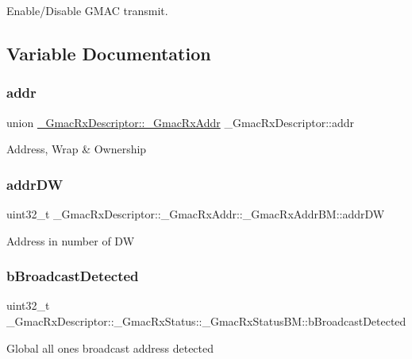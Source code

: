 Enable/\+Disable G\+M\+AC transmit. 

\subsection{Variable Documentation}
\mbox{\label{group__gmac__defines_ga9bc3c47006fd42d92c6fdef66a1b4762}} 
\subsubsection{\texorpdfstring{addr}{addr}}
{\footnotesize\ttfamily union \mbox{\hyperlink{union__GmacRxDescriptor_1_1__GmacRxAddr}{\+\_\+\+Gmac\+Rx\+Descriptor\+::\+\_\+\+Gmac\+Rx\+Addr}}  \+\_\+\+Gmac\+Rx\+Descriptor\+::addr}

Address, Wrap \& Ownership \mbox{\label{group__gmac__defines_ga6debab2368d4f0df7f6493cc059576f5}} 
\subsubsection{\texorpdfstring{addrDW}{addrDW}}
{\footnotesize\ttfamily uint32\+\_\+t \+\_\+\+Gmac\+Rx\+Descriptor\+::\+\_\+\+Gmac\+Rx\+Addr\+::\+\_\+\+Gmac\+Rx\+Addr\+B\+M\+::addr\+DW}

Address in number of DW \mbox{\label{group__gmac__defines_ga7384907699406fb05731360bdfc7866c}} 
\subsubsection{\texorpdfstring{bBroadcastDetected}{bBroadcastDetected}}
{\footnotesize\ttfamily uint32\+\_\+t \+\_\+\+Gmac\+Rx\+Descriptor\+::\+\_\+\+Gmac\+Rx\+Status\+::\+\_\+\+Gmac\+Rx\+Status\+B\+M\+::b\+Broadcast\+Detected}

Global all ones broadcast address detected \mbox{\label{group__gmac__defines_ga614ebbda15781fa167acefa95bf80968}} 
